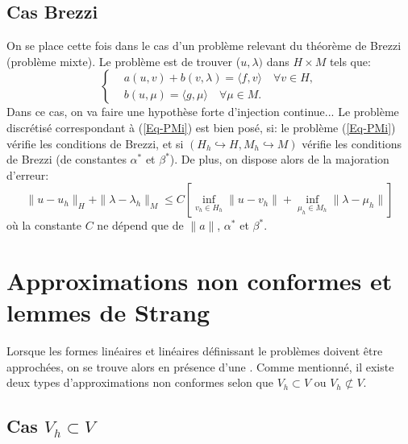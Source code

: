 \subsection{Cas Brezzi}
On se place cette fois dans le cas d'un problème relevant du théorème de Brezzi
(problème mixte).
Le problème est de trouver ($u, \lambda)$ dans $H\times M$ tels que:
 \begin{equation}\label{Eq-PMi}
\left\{
\begin{aligned}
 &a(u,v) + b(v, \lambda) = \langle f,v\rangle \quad \forall v\in H,\\
&b(u,\mu) = \langle g,\mu\rangle \quad \forall \mu \in M.
\end{aligned}\right.
\end{equation}
\medskip
Dans ce cas, on va faire une hypothèse forte d'injection continue...
\medskip
Le problème discrétisé correspondant à (\ref{Eq-PMi}) est bien posé, si:
le problème (\ref{Eq-PMi}) vérifie les conditions de Brezzi, et si
$(H_h\hookrightarrow H, M_h\hookrightarrow M)$ vérifie les conditions de
Brezzi (de constantes $\alpha^*$ et $\beta^*$).
\medskip
De plus, on dispose alors de la majoration d'erreur:
\begin{equation}
\|u-u_h\|_H + \|\lambda-\lambda_h\|_M \le C\left[
\inf_{v_h\in H_h} \|u-v_h\|
+ \inf_{\mu_h\in M_h} \|\lambda-\mu_h\|
\right]
\end{equation}
où la constante $C$ ne dépend que de $\|a\|$, $\alpha^*$ et
$\beta^*$.


\medskip
\section{Approximations non conformes et lemmes de Strang}\label{Sec-Strang}

Lorsque les formes linéaires et linéaires définissant le problèmes doivent
être approchées, on se trouve alors en présence d'une .
Comme mentionné, il existe deux types d'approximations non conformes selon que
$V_h\subset V$ ou $V_h\not\subset V$.
\medskip
\subsection{Cas $V_h\subset V$}

